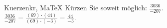 \begin{MAufgabe}{Kuerzen}{kr, MaTeX}
K\"urzen Sie soweit m\"oglich: $\frac{3036}{-207}$.\\ 
\ifLsg\MLoesung
\quad $\frac{3036}{-207}=\frac{(69)\cdot(44)}{(69)\cdot(-3)}=\frac{44}{-3}$.\else\relax\fi
 \end{MAufgabe}